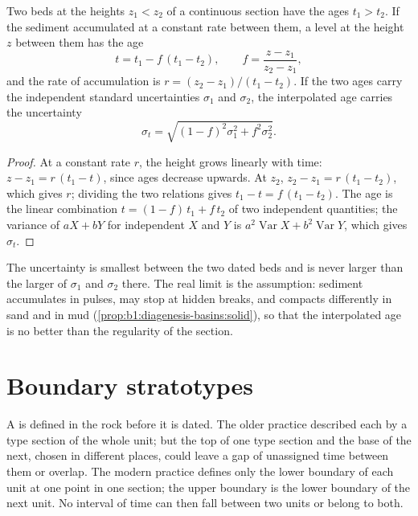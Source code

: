 \begin{proposition}\label{prop:b1:stratigraphic-scale:interpolation}
Two beds at the heights $z_1 < z_2$ of a continuous section have the ages
$t_1 > t_2$. If the sediment accumulated at a constant rate between them, a
level at the height $z$ between them has the age
\[
  t = t_1 - f\,(t_1 - t_2), \qquad f = \frac{z - z_1}{z_2 - z_1},
\]
and the rate of accumulation is $r = (z_2 - z_1)/(t_1 - t_2)$. If the two ages
carry the independent standard uncertainties $\sigma_1$ and $\sigma_2$, the
interpolated age carries the uncertainty
\[
  \sigma_t = \sqrt{(1 - f)^2 \sigma_1^2 + f^2 \sigma_2^2}.
\]
\end{proposition}

\begin{proof}
At a constant rate $r$, the height grows linearly with time: $z - z_1 = r\,(t_1
- t)$, since ages decrease upwards. At $z_2$, $z_2 - z_1 = r\,(t_1 - t_2)$, which
gives $r$; dividing the two relations gives $t_1 - t = f\,(t_1 - t_2)$. The age
is the linear combination $t = (1 - f)\,t_1 + f\,t_2$ of two independent
quantities; the variance of $a X + b Y$ for independent $X$ and $Y$ is $a^2
\operatorname{Var} X + b^2 \operatorname{Var} Y$, which gives $\sigma_t$.
\end{proof}

The uncertainty is smallest between the two dated beds and is never larger than
the larger of $\sigma_1$ and $\sigma_2$ there. The real limit is the assumption:
sediment accumulates in pulses, may stop at hidden breaks, and compacts
differently in sand and in mud (\cref{prop:b1:diagenesis-basins:solid}), so that
the interpolated age is no better than the regularity of the section.

\section{Boundary stratotypes}\label{sec:b1:stratigraphic-scale:gssp}

A  is defined in the rock before it is dated. The older
practice described each  by a type section of the whole unit; but the top
of one type section and the base of the next, chosen in different places, could
leave a gap of unassigned time between them or overlap. The modern practice
defines only the lower boundary of each unit at one point in one section; the
upper boundary is the lower boundary of the next unit. No interval of time can
then fall between two units or belong to both.

